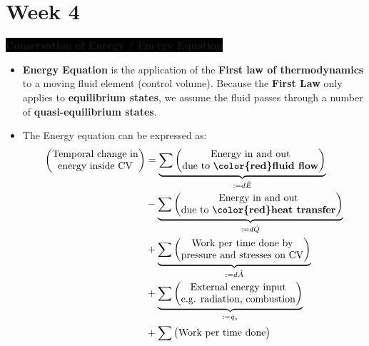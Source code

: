 \section{Week 4}
\colorbox{black}{\textbf{\color{white}Conservation of Energy / Energy Equation}}
\begin{itemize}
    \item \textbf{\color{orange}Energy Equation} is the application of the \textbf{\color{teal}First law of thermodynamics} to a moving fluid element (control volume). Because the \textbf{\color{teal}First Law} only applies to \textbf{\color{red}equilibrium states}, we assume the fluid passes through a number of \textbf{\color{red}quasi-equilibrium states}.
    \item The Energy equation can be expressed as:
    \begin{align*}
        \begin{pmatrix}
            \text{Temporal change in}\\
            \text{energy inside CV}
        \end{pmatrix} &= \underbrace{\sum \begin{pmatrix}
            \text{Energy in and out} \\
            \text{due to \textbf{\color{red}fluid flow}}
        \end{pmatrix}}_{:= d\dot{E}} \\
        &- \underbrace{\sum \begin{pmatrix}
            \text{Energy in and out} \\
            \text{due to \textbf{\color{red}heat transfer}}
        \end{pmatrix}}_{:= d\dot{Q}} \\
        &+ \underbrace{\sum \begin{pmatrix}
            \text{Work per time done by} \\
            \text{pressure and stresses on CV}
        \end{pmatrix}}_{:=d\dot{A}} \\
        &+ \underbrace{\sum \begin{pmatrix}
            \text{External energy input} \\
            \text{e.g. radiation, combustion}
        \end{pmatrix}}_{:=\dot{q}_s} \\
        &+ \sum \begin{pmatrix}
            \text{Work per time done} \\

\end{pmatrix}
\end{align*}
\end{itemize}
